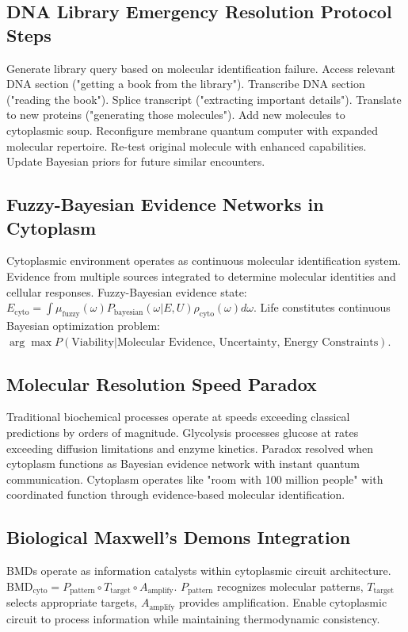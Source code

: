 \documentclass[12pt,a4paper]{article}
\begin{document}
\subsection{DNA Library Emergency Resolution Protocol Steps}

Generate library query based on molecular identification failure. Access relevant DNA section ("getting a book from the library"). Transcribe DNA section ("reading the book"). Splice transcript ("extracting important details"). Translate to new proteins ("generating those molecules"). Add new molecules to cytoplasmic soup. Reconfigure membrane quantum computer with expanded molecular repertoire. Re-test original molecule with enhanced capabilities. Update Bayesian priors for future similar encounters.

\subsection{Fuzzy-Bayesian Evidence Networks in Cytoplasm}

Cytoplasmic environment operates as continuous molecular identification system. Evidence from multiple sources integrated to determine molecular identities and cellular responses. Fuzzy-Bayesian evidence state: $E_{\text{cyto}} = \int \mu_{\text{fuzzy}}(\omega) P_{\text{bayesian}}(\omega | E, U) \rho_{\text{cyto}}(\omega) d\omega$. Life constitutes continuous Bayesian optimization problem: $\arg \max P(\text{Viability} | \text{Molecular Evidence, Uncertainty, Energy Constraints})$.

\subsection{Molecular Resolution Speed Paradox}

Traditional biochemical processes operate at speeds exceeding classical predictions by orders of magnitude. Glycolysis processes glucose at rates exceeding diffusion limitations and enzyme kinetics. Paradox resolved when cytoplasm functions as Bayesian evidence network with instant quantum communication. Cytoplasm operates like "room with 100 million people" with coordinated function through evidence-based molecular identification.

\subsection{Biological Maxwell's Demons Integration}

BMDs operate as information catalysts within cytoplasmic circuit architecture. $\text{BMD}_{\text{cyto}} = P_{\text{pattern}} \circ T_{\text{target}} \circ A_{\text{amplify}}$. $P_{\text{pattern}}$ recognizes molecular patterns, $T_{\text{target}}$ selects appropriate targets, $A_{\text{amplify}}$ provides amplification. Enable cytoplasmic circuit to process information while maintaining thermodynamic consistency.
\end{document}
